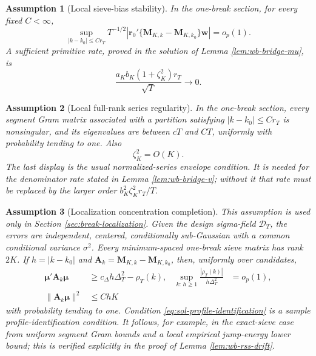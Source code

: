 \documentclass[12pt]{article}
\numberwithin{equation}{section}
\newtheorem{assumption}{Assumption}
\theoremstyle{definition}
\begin{document}
\begin{assumption}[Local sieve-bias stability]
\label{ass:sol-local-bias}
In the one-break section, for every fixed \(C<\infty\),
\begin{equation}
    \sup_{|k-k_0|\leq Cr_T}
    T^{-1/2}\left|
      \bm r_0'\{\bm M_{K,k}-\bm M_{K,k_0}\}\bm w
    \right|=o_p(1).
    \label{eq:sol-local-bias}
\end{equation}
A sufficient primitive rate, proved in the solution of Lemma
\ref{lem:wb-bridge-mu}, is
\begin{equation}
    \frac{a_K b_K(1+\zeta_K^2)r_T}{\sqrt T}\longrightarrow0.
    \label{eq:sol-local-bias-sufficient}
\end{equation}
\end{assumption}

\begin{assumption}[Local full-rank series regularity]
\label{ass:sol-local-series}
In the one-break section, every segment Gram matrix associated with a
partition satisfying \(|k-k_0|\leq Cr_T\) is nonsingular, and its eigenvalues
are between \(cT\) and \(CT\), uniformly with probability tending to one.
Also
\begin{equation}
    \zeta_K^2=O(K).
    \label{eq:sol-regular-envelope}
\end{equation}
The last display is the usual normalized-series envelope condition.  It is
needed for the denominator rate stated in Lemma \ref{lem:wb-bridge-v}; without
it that rate must be replaced by the larger order
\(b_K^2\zeta_K^2r_T/T\).
\end{assumption}

\begin{assumption}[Localization concentration completion]
\label{ass:sol-localization}
This assumption is used only in Section \ref{sec:break-localization}.  Given
the design sigma-field \(\mathcal D_T\), the errors are independent, centered,
conditionally sub-Gaussian with a common conditional variance \(\sigma^2\).
Every minimum-spaced one-break sieve matrix has rank \(2K\).  If
\(h=|k-k_0|\) and
\(\bm A_k=\bm M_{K,k}-\bm M_{K,k_0}\), then, uniformly over candidates,
\begin{align}
    \bm\mu'\bm A_k\bm\mu
    &\geq c_\Delta h\Delta_T^2-\rho_T(k),
    &
    \sup_{k:\,h\geq1}\frac{|\rho_T(k)|}{h\Delta_T^2}&=o_p(1),
    \label{eq:sol-profile-identification}
    \\
    \|\bm A_k\bm\mu\|^2&\leq C hK
    \label{eq:sol-mean-sensitivity}
\end{align}
with probability tending to one.  Condition
\eqref{eq:sol-profile-identification} is a sample profile-identification
condition.  It follows, for example, in the exact-sieve case from uniform
segment Gram bounds and a local empirical jump-energy lower bound; this is
verified explicitly in the proof of Lemma \ref{lem:wb-rss-drift}.
\end{assumption}
\end{document}
